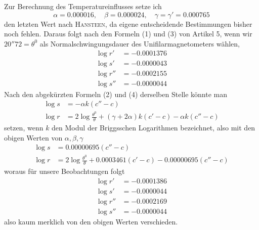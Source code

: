 Zur Berechnung des Temperatureinflusses setze ich
\[
\alpha=0.000016,\quad\beta=0.000024,\quad\gamma=\gamma'=0.000765
\]
den letzten Wert nach \textsc{Hansteen}, da eigene entscheidende Bestimmungen bisher noch fehlen. Daraus folgt nach den Formeln (1) und (3) von Artikel 5, wenn wir $20''72=\theta^0$ als Normalschwingungsdauer des Unifilarmagnetometers wählen,
\[
\begin{aligned}
\log r'&=-0.0001376\\
\log s'&=-0.0000043\\
\log r''&=-0.0002155\\
\log s''&=-0.0000044
\end{aligned}
\]
Nach den abgekürzten Formeln (2) und (4) derselben Stelle könnte man
\[
\begin{aligned}
\log s&=-\alpha k(c''-c)\\
\log r&=2\log\frac{\theta^0}{\theta}+(\gamma+2\alpha)k(c'-c)-\alpha k(c''-c)
\end{aligned}
\]
setzen, wenn $k$ den Modul der Briggsschen Logarithmen bezeichnet, also mit den obigen Werten von $\alpha,\beta,\gamma$
\[
\begin{aligned}
\log s&=0.00000695(c''-c)\\
\log r&=2\log\frac{\theta^0}{\theta}+0.0003461(c'-c)-0.00000695(c''-c)
\end{aligned}
\]
woraus für unsere Beobachtungen folgt
\[
\begin{aligned}
\log r'&=-0.0001386\\
\log s'&=-0.0000044\\
\log r''&=-0.0002169\\
\log s''&=-0.0000044
\end{aligned}
\]
also kaum merklich von den obigen Werten verschieden.


